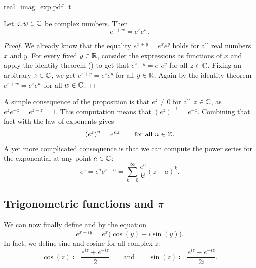 \begin{myfigureht}
{real_imag_exp.pdf_t}
\caption{Graphs of the real part (left) and imaginary part (right)
of the complex exponential $e^z = e^{x+iy}$.  The $x$-axis goes from $-4$ to
$4$, the $y$-axis goes from $-6$ to $6$, and the vertical axis goes from
$-e^{4} \approx -54.6$
to
$e^{4} \approx 54.6$.  The plot of the real exponential ($y=0$)
is marked in a bold line.\label{fig:complexexpgraphs}}
\end{myfigureht}

\begin{prop}
Let $z,w \in {\mathbb{C}}$ be complex numbers.  Then
\begin{equation*}
e^{z+w} = e^z e^w.
\end{equation*}
\end{prop}

\begin{proof}
We already know that
the equality
$e^{x+y} = e^x e^y$ holds for all
real numbers $x$ and $y$.
For every fixed $y \in {\mathbb{R}}$, consider the expressions as
functions of $x$ and apply the identity theorem
() to get that
$e^{z+y} = e^ze^y$ for all $z \in {\mathbb{C}}$.  Fixing an arbitrary $z \in {\mathbb{C}}$,
we get
$e^{z+y} = e^ze^y$ for all $y \in {\mathbb{R}}$.  Again by the identity theorem 
$e^{z+w} = e^z e^w$
for all $w \in {\mathbb{C}}$.
\end{proof}

A simple consequence of the proposition is that $e^z\not=0$ for all $z \in {\mathbb{C}}$,
as $e^z e^{-z} = e^{z-z} = 1$.
This computation means that ${(e^z)}^{-1} = e^{-z}$.
Combining that fact with the law of exponents gives
\begin{equation*}
{(e^z)}^{n} = e^{nz} \qquad \text{for all } n \in {\mathbb{Z}}.
\end{equation*}
A yet more complicated consequence is that we
can compute the power series for the exponential at any point $a \in
{\mathbb{C}}$:
\begin{equation*}
e^z = e^a e^{z-a} = \sum_{k=0}^\infty \frac{e^a}{k!} {(z-a)}^k .
\end{equation*}

\subsection{Trigonometric functions and $\pi$}

We can now finally define \emph{} and \emph{}
by the equation
\begin{equation*}
e^{x+iy} = e^x \bigl( \cos(y) + i \sin(y) \bigr) .
\end{equation*}
In fact, we define sine and cosine for all complex $z$:
\begin{equation*}
\cos(z) \coloneqq \frac{e^{iz} + e^{-iz}}{2}
\qquad\text{and}\qquad
\sin(z) \coloneqq \frac{e^{iz} - e^{-iz}}{2i} .
\end{equation*}


